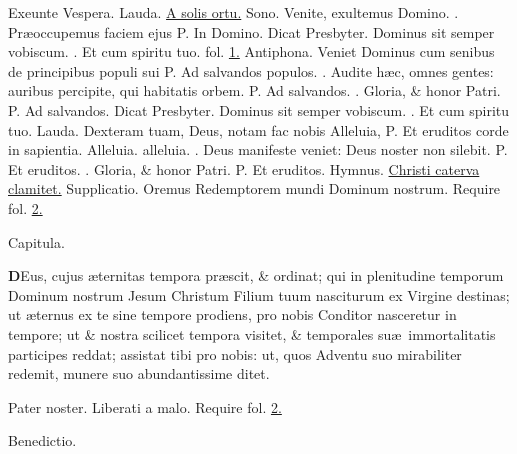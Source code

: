 \documentclass[letter,11pt]{book}
\makeatletter
\DeclareRobustCommand{\Vbar}{\vers@resp{-0.1em}{V}}
\DeclareRobustCommand{\Rbar}{\vers@resp{0pt}{R}}
\newcommand{\vers@resp@sym}{\raisebox{0.2ex}{\rotatebox[origin=c]{-20}{$\m@th\rceil$}}}
\newcommand{\vers@resp}[2]{%
  {\ooalign{\hidewidth\kern#1\vers@resp@sym\hidewidth\cr#2\cr}}%
}%
\def\P{\color{Red} P. \color{black}}
\def\V{\color{Red} \Vbar . \color{black}}
\def\R{\color{Red} \Rbar . \color{black}}
\makeatother
\begin{document}
\begin{multicols}{2}
\newline \color{Red} \hypertarget{DOM-PRIMA-ADV-VES-II}{Exeunte Vespera.} Lauda. \color{black} \hyperlink{Vespertinum1}{A solis ortu.}
\newline \color{Red} Sono. \color{black} Venite, exultemus Domino. \V Pr\ae occupemus faciem ejus \P In Domino.
\newline \color{Red} Dicat Presbyter. \color{black} Dominus sit semper vobiscum. \R Et cum spiritu tuo. \color{Red} fol. \color{black} \hyperlink{page.1}{1.}
\newline \color{Red} Antiphona. \color{black} Veniet Dominus cum senibus de principibus populi sui \P Ad salvandos populos. \V Audite h\ae c, omnes gentes: auribus percipite, qui habitatis orbem. \P Ad salvandos. \V Gloria, \& honor Patri. \P Ad salvandos.
\newline \color{Red} Dicat Presbyter. \color{black} Dominus sit semper vobiscum. \R Et cum spiritu tuo.
\newline \color{Red} Lauda. \color{black} Dexteram tuam, Deus, notam fac nobis Alleluia, \P Et eruditos corde in sapientia. Alleluia. alleluia. \V Deus manifeste veniet: Deus noster non silebit. \P Et eruditos. \V Gloria, \& honor Patri. \P Et eruditos.
\newline \color{Red} Hymnus. \color{black} \hyperlink{hymn.Christi}{Christi caterva clamitet.} \color{Red} Supplicatio. \color{black} Oremus Redemptorem mundi Dominum nostrum. \color{Red} Require fol. \color{black} \hyperlink{Supplicatio}{2.}
\vspace{-.75em} \begin{center} \color{Red} Capitula. \end{center} \vspace{-.75em}
\lettrine[lines=2]{\bfseries \color{Red} D}{}Eus, cujus \ae ternitas tempora pr\ae scit, \& ordinat; qui in plenitudine temporum Dominum nostrum Jesum Christum Filium tuum nasciturum ex Virgine destinas; ut \ae ternus ex te sine tempore prodiens, pro nobis Conditor nasceretur in tempore; ut \& nostra scilicet tempora visitet, \& temporales su\ae \ immortalitatis participes reddat; assistat tibi pro nobis: ut, quos Adventu suo mirabiliter redemit, munere suo abundantissime ditet.
\par Pater noster. Liberati a malo. \color{Red} Require fol. \color{black} \hyperlink{page.2}{2.}
\vspace{-.75em} \begin{center} \color{Red} Benedictio. \end{center} \vspace{-.75em}

\end{multicols}
\end{document}

